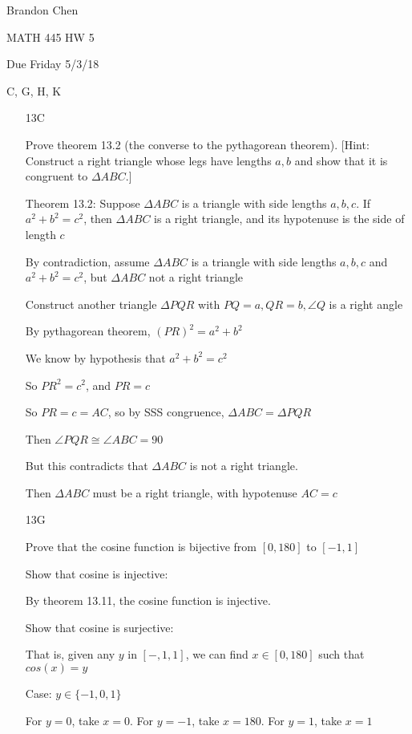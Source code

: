 \documentclass[11pt]{article}
\begin{document}
\noindent Brandon Chen

\noindent MATH 445 HW 5

\noindent Due Friday 5/3/18

 C, G, H, K

\begin{itemize}


	\item[13C]

		Prove theorem 13.2 (the converse to the pythagorean theorem). [Hint: Construct a right triangle whose legs have lengths $a,b$ and show that it is congruent to $\Delta ABC$.]

		Theorem 13.2: Suppose $\Delta ABC$ is a triangle with side lengths $a,b,c$. If $a^2 + b^2 = c^2$, then $\Delta ABC$ is a right triangle, and its hypotenuse is the side of length $c$

		By contradiction, assume $\Delta ABC$ is a triangle with side lengths $a,b,c$ and $a^2 + b^2 = c^2$, but $\Delta ABC$ not a right triangle

		Construct another triangle $\Delta PQR$ with $PQ = a, QR = b, \angle Q$ is a right angle

		By pythagorean theorem, $(PR)^2 = a^2 + b^2$

		We know by hypothesis that $a^2 + b^2 = c^2$

		So $PR^2 = c^2$, and $PR = c$

		So $PR = c = AC$, so by SSS congruence, $\Delta ABC = \Delta PQR$

		Then $\angle PQR \cong \angle ABC = 90$

		But this contradicts that $\Delta ABC$ is not a right triangle.

		Then $\Delta ABC$ must be a right triangle, with hypotenuse $AC = c$

	\item[13G]

		Prove that the cosine function is bijective from $[0,180]$ to $[-1,1]$

		Show that cosine is injective:

		By theorem 13.11, the cosine function is injective.

		Show that cosine is surjective:

		That is, given any $y$ in $[-,1,1]$, we can find $x \in [0,180]$ such that $cos(x) = y$

		Case: $y \in \{-1, 0, 1\}$

		For $y = 0$, take $x = 0$. For $y = -1$, take $x = 180$. For $y = 1$, take $x = 1$


\end{itemize}
\end{document}
